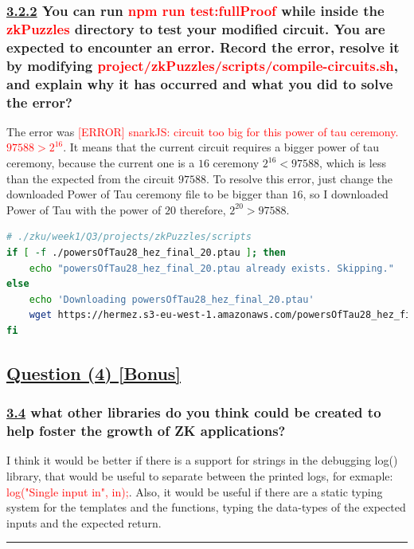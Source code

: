 \documentclass[letterpaper, 10 pt, conference]{ieeeconf}  %
\begin{document}
\subsubsection{\textbf{\underline{3.2.2} You can run \textcolor{red}{npm run test:fullProof} while inside the \textcolor{red}{zkPuzzles} directory to test your modified circuit. You are expected to encounter an error. Record the error, resolve it by modifying \textcolor{red}{project/zkPuzzles/scripts/compile-circuits.sh}, and explain why it has occurred and what you did to solve the error?}}

The error was \textcolor{red}{[ERROR] snarkJS: circuit too big for this power of tau ceremony. $97588 > 2^{16}$}.
It means that the current circuit requires a bigger power of tau ceremony, because the current one is a $16$ ceremony $2^{16} < 97588$, which is less than the expected from the circuit $97588$. To resolve this error, just change the downloaded Power of Tau ceremony file to be bigger than $16$, so I downloaded Power of Tau with the power of $20$ therefore, $2^{20} > 97588$.

\begin{lstlisting}[language=Bash, caption=Expected solution]
# ./zku/week1/Q3/projects/zkPuzzles/scripts
if [ -f ./powersOfTau28_hez_final_20.ptau ]; then
    echo "powersOfTau28_hez_final_20.ptau already exists. Skipping."
else
    echo 'Downloading powersOfTau28_hez_final_20.ptau'
    wget https://hermez.s3-eu-west-1.amazonaws.com/powersOfTau28_hez_final_20.ptau
fi
\end{lstlisting}

\subsection{\textbf{\underline{Question (4) [Bonus]}}}
\subsubsection{\textbf{\underline{3.4} what other libraries do you think could be created to help foster the growth of ZK applications?}}

I think it would be better if there is a support for strings in the debugging log() library, that would be useful to separate between the printed logs, for exmaple: \textcolor{red}{log("Single input in",  in);}.
Also, it would be useful if there are a static typing system for the templates and the functions, typing the data-types of the expected inputs and the expected return.

\noindent\rule{8cm}{0.4pt}
\end{document}
